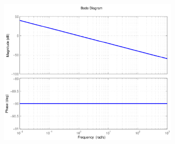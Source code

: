 \documentclass[twoside]{article}
\begin{document}
\begin{figure}[htbp]
\begin{subfigure}{0.25\textwidth}
	\caption{}
	\label{fig:frekchar:b}
\end{subfigure}\hfil %
\begin{subfigure}{0.25\textwidth}
	\includegraphics[width=\linewidth]{zadani12-c}
  \caption{}
  \label{fig:frekchar:c}
\end{subfigure}


\end{figure}
\end{document}
